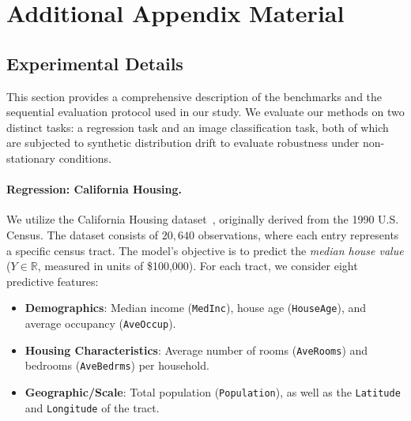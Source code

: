 \documentclass{uai2026} %
\newcommand{\1}{\mathbf{1}}
\begin{document}

\section{Additional Appendix Material}
\label{app:additional_material}

\subsection{Experimental Details}
\label{app:extra_experiments}

This section provides a comprehensive description of the benchmarks and the sequential evaluation protocol used in our study. We evaluate our methods on two distinct tasks: a regression task and an image classification task, both of which are subjected to synthetic distribution drift to evaluate robustness under non-stationary conditions.

\paragraph{Regression: California Housing.}
We utilize the California Housing dataset~\citep{california_housing}, originally derived from the 1990 U.S. Census. The dataset consists of $20{,}640$ observations, where each entry represents a specific census tract. The model's objective is to predict the \emph{median house value} ($Y \in \mathbb{R}$, measured in units of \$100{,}000). For each tract, we consider eight predictive features:
\begin{itemize}
  \item \textbf{Demographics}: Median income (\texttt{MedInc}), house age (\texttt{HouseAge}), and average occupancy (\texttt{AveOccup}).
  \item \textbf{Housing Characteristics}: Average number of rooms (\texttt{AveRooms}) and bedrooms (\texttt{AveBedrms}) per household.
  \item \textbf{Geographic/Scale}: Total population (\texttt{Population}), as well as the \texttt{Latitude} and \texttt{Longitude} of the tract.
\end{itemize}
\end{document}
